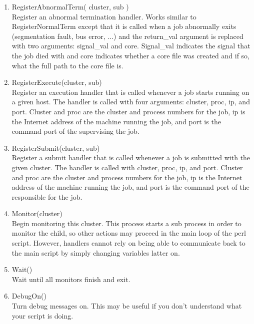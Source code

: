 \begin{enumerate}
	\item RegisterAbnormalTerm( cluster, sub ) \\
	Register an abnormal termination handler.  Works similar to 
	RegisterNormalTerm except that it is called when a job abnormally 
	exits (segmentation fault, bus error, ...) and the return\_val
	argument is replaced with two arguments: signal\_val and core.
	Signal\_val indicates the signal that the job died with and
	core indicates whether a core file was created and if so, what
	the full path to the core file is.

	\item RegisterExecute(cluster, sub) \\
	Register an execution handler that is called whenever a job starts
	running on a given host.  The handler is called with four arguments:
	cluster, proc, ip, and port.  Cluster and proc are the cluster and
	process numbers for the job, ip is the Internet address of the
	machine running the job, and port is the command port of the 
	 supervising the job.

	\item RegisterSubmit(cluster, sub) \\
	Register a submit handler that is called whenever a job is submitted
	with the given cluster.  The handler is called with cluster, proc,
	ip, and port.  Cluster and proc are the cluster and
	process numbers for the job, ip is the Internet address of the
	machine running the job, and port is the command port of the 
	 responsible for the job.

	\item Monitor(cluster) \\
	Begin monitoring this cluster.  This process starts a sub process
	in order to monitor the child, so other actions may proceed in the
	main loop of the perl script.  However, handlers cannot rely on
	being able to communicate back to the main script by simply changing
	variables latter on.
	
	\item Wait() \\
	Wait until all monitors finish and exit.

	\item DebugOn() \\
	Turn debug messages on.  This may be useful if you don't understand
	what your script is doing.	
\end{enumerate}


